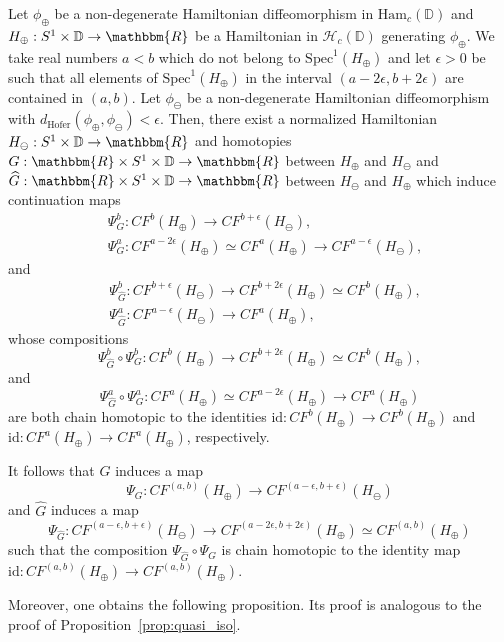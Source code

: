 \documentclass[AHL,Unicode,longabstracts,published]{cedram}
\newcommand{\R}{\mathbbm{R}}
\newcommand{\D}{\mathbb{D}}
\newcommand{\Ham}{\mathrm{Ham}}
\newcommand{\hofer}{\mathrm{Hofer}}
\newcommand{\Spec}{\mathrm{Spec}}
\newcommand{\rid}{\mathrm{id}}
\newcommand{\clH}{\mathcal{H}}
\newcommand{\hofer}{\mathrm{Hofer}}
\begin{document}
\begin{prop}\label{prop:chainisodiskc}
Let $\phi_\oplus$ be a non-degenerate Hamiltonian diffeomorphism in $\Ham_c(\D)$ and $H_\oplus:S^1 \times \D \to \R$ be a Hamiltonian in $\clH_c(\D)$ generating $\phi_\oplus$. We take real numbers $a<b$ which do not belong to $\Spec^1(H_\oplus)$ and let $\epsilon>0$ be such that all elements of $\Spec^1(H_\oplus)$ in the interval $(a-2\epsilon, b+2\epsilon)$ are contained in $(a,b)$. Let $\phi_\ominus$ be a non-degenerate Hamiltonian diffeomorphism with $d_{\hofer}(\phi_\oplus, \phi_\ominus)< \epsilon$. Then, there exist a normalized Hamiltonian $H_\ominus: S^1 \times \D \to \R $ and homotopies $G: \R \times S^1 \times \D \to \R $ between $H_\oplus$ and $H_\ominus$ and $\widehat{G}: \R \times S^1 \times \D \to \R $ between $H_\ominus$ and $H_\oplus$ which induce continuation maps
\begin{align*}
& \Psi_G^b: CF^{b}(H_\oplus) \to CF^{b+\epsilon}(H_\ominus), \\ & \Psi_G^a: CF^{a - 2\epsilon}(H_\oplus) \simeq CF^{a }(H_\oplus) \to CF^{a-\epsilon}(H_\ominus),
\end{align*}
and
\begin{align*}
& \Psi_{\widehat{G}}^b: CF^{b+ \epsilon}(H_\ominus) \to CF^{b+2\epsilon}(H_\oplus) \simeq CF^{b}(H_\oplus), \\ & \Psi_{\widehat{G}}^a: CF^{a-\epsilon }(H_\ominus) \to CF^{a}(H_\oplus),
\end{align*}
whose compositions
\[
\Psi_{\widehat{G}}^b\circ \Psi_G^b: CF^{b}(H_\oplus) \to CF^{b+ 2\epsilon}(H_\oplus) \simeq CF^{b }(H_\oplus),
\]
and
\[
\Psi_{\widehat{G}}^a\circ \Psi_G^a: CF^{a}(H_\oplus) \simeq CF^{a - 2\epsilon}(H_\oplus) \to CF^{a}(H_\oplus)
\]
are both chain homotopic to the identities ${\rid}: CF^{b}(H_\oplus) \to CF^{b}(H_\oplus) $ and ${\rid}: CF^{a}(H_\oplus) \to CF^{a}(H_\oplus) $, respectively.

It follows that $G$ induces a map
\[
\Psi_G: CF^{(a,b)}(H_\oplus) \to CF^{(a-\epsilon, b+\epsilon)}(H_\ominus)
\]
and $\widehat{G}$ induces a map
\[
\Psi_{\widehat{G}}: CF^{(a-\epsilon, b+\epsilon)}(H_\ominus) \to CF^{(a-2\epsilon,b+2\epsilon)}(H_\oplus) \simeq CF^{(a,b)}(H_\oplus)
\]
such that the composition $\Psi_{\widehat{G}}\circ \Psi_G$ is chain homotopic to the identity map ${\rid}: CF^{(a,b)}(H_\oplus) \to CF^{(a,b)}(H_\oplus) $.
\end{prop}

Moreover, one obtains the following proposition. Its proof is analogous to the proof of Proposition~\ref{prop:quasi_iso}.
\end{document}
